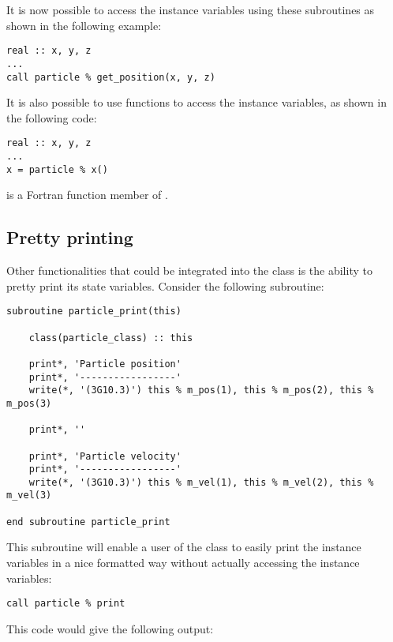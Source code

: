 It is now possible to access the instance variables using these subroutines as shown in the following example:

\begin{lstlisting}
real :: x, y, z
...
call particle % get_position(x, y, z)
\end{lstlisting}

It is also possible to use functions to access the instance variables, as shown in the following code:

\begin{lstlisting}
real :: x, y, z
...
x = particle % x()
\end{lstlisting}

 is a Fortran function member of .

\subsection{Pretty printing}

Other functionalities that could be integrated into the class is the ability to pretty print its state variables. Consider the following subroutine:

\begin{lstlisting}
subroutine particle_print(this)

    class(particle_class) :: this

    print*, 'Particle position'
    print*, '-----------------'
    write(*, '(3G10.3)') this % m_pos(1), this % m_pos(2), this % m_pos(3)

    print*, ''

    print*, 'Particle velocity'
    print*, '-----------------'
    write(*, '(3G10.3)') this % m_vel(1), this % m_vel(2), this % m_vel(3)

end subroutine particle_print
\end{lstlisting}

This subroutine will enable a user of the class to easily print the instance variables in a nice formatted way without actually accessing the instance variables:

\begin{lstlisting}
call particle % print
\end{lstlisting}

This code would give the following output:

\cmdmode

